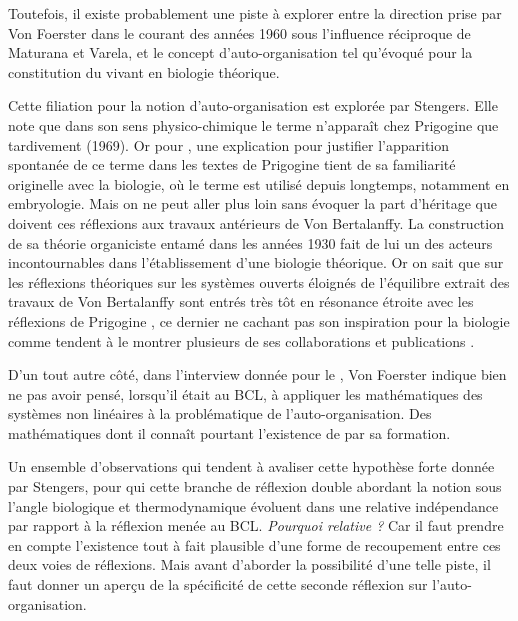 Toutefois, il existe probablement une piste à explorer entre la direction prise par Von Foerster dans le courant des années 1960 sous l'influence réciproque de Maturana et Varela, et le concept d'auto-organisation tel qu'évoqué pour la constitution du vivant en biologie théorique. 

Cette filiation pour la notion d'auto-organisation est explorée par Stengers. Elle note que dans son sens physico-chimique le terme n’apparaît chez Prigogine que tardivement (1969). Or pour \textcite[64]{Stengers1985}, une explication pour justifier l'apparition spontanée de ce terme dans les textes de Prigogine tient de sa familiarité originelle avec la biologie, où le terme est utilisé depuis longtemps, notamment en embryologie. Mais on ne peut aller plus loin sans évoquer la part d'héritage que doivent ces réflexions aux travaux antérieurs de Von Bertalanffy. La construction de sa théorie organiciste  entamé dans les années 1930 fait de lui un des acteurs incontournables dans l'établissement d'une biologie théorique. Or on sait que sur les réflexions théoriques sur les systèmes ouverts éloignés de l'équilibre extrait des travaux de Von Bertalanffy sont entrés très tôt en résonance étroite \autocite[653-661]{Pouvreau2013} avec les réflexions de Prigogine \autocite{Prigogine1996}, ce dernier ne cachant pas son inspiration pour la biologie comme tendent à le montrer plusieurs de ses collaborations et publications \autocites[59-67]{Stengers1985}{Prigogine1946}.

D'un tout autre côté, dans l'interview donnée pour le \textcite[255]{CREA1985}, Von Foerster indique bien ne pas avoir pensé, lorsqu'il était au BCL, à appliquer les mathématiques des systèmes non linéaires à la problématique de l'auto-organisation. Des mathématiques dont il connaît pourtant l'existence de par sa formation.


Un ensemble d'observations qui tendent à avaliser cette hypothèse forte donnée par Stengers, pour qui cette branche de réflexion double abordant la notion sous l'angle biologique et thermodynamique évoluent dans une relative indépendance par rapport à la réflexion menée au BCL. \textit{Pourquoi relative ?} Car il faut prendre en compte l'existence tout à fait plausible d'une forme de recoupement entre ces deux voies de réflexions. Mais avant d'aborder la possibilité d'une telle piste, il faut donner un aperçu de la spécificité de cette seconde réflexion sur l'auto-organisation.


